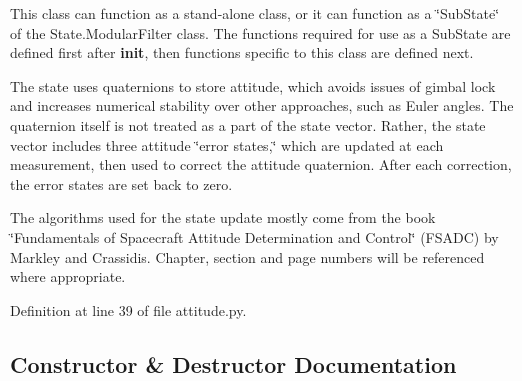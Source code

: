 This class can function as a stand-\/alone class, or it can function as a \char`\"{}\+Sub\+State\char`\"{} of the State.\+Modular\+Filter class. The functions required for use as a Sub\+State are defined first after {\bfseries init}, then functions specific to this class are defined next.

The state uses quaternions to store attitude, which avoids issues of gimbal lock and increases numerical stability over other approaches, such as Euler angles. The quaternion itself is not treated as a part of the state vector. Rather, the state vector includes three attitude \char`\"{}error states,\char`\"{} which are updated at each measurement, then used to correct the attitude quaternion. After each correction, the error states are set back to zero.

The algorithms used for the state update mostly come from the book \char`\"{}\+Fundamentals of Spacecraft Attitude Determination and Control\char`\"{} (F\+S\+A\+DC) by Markley and Crassidis. Chapter, section and page numbers will be referenced where appropriate. 

Definition at line 39 of file attitude.\+py.



\subsection{Constructor \& Destructor Documentation}
